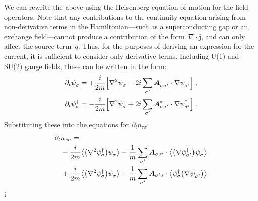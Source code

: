 We can rewrite the above using the Heisenberg equation of motion for the field operators.
Note that any contributions to the continuity equation arising from non-derivative terms in the Hamiltonian---such as a superconducting gap or an exchange field---cannot produce a contribution of the form~$\nabla\cdot\bm{j}$, and can only affect the source term~$q$.
Thus, for the purposes of deriving an expression for the current, it is sufficient to consider only derivative terms.
Including U(1) and SU(2) gauge fields, these can be written in the form:
\begin{align}
  \p t \pc{\psi_\sigma} &= +\frac{i}{2m} \Big[ \nabla^2\pc{\psi_\sigma} - 2i\sum_{\sigma'} \pc{\bm{A}_{\sigma\sigma'}} \cdot \nabla \pc{\psi_{\sigma'}} \Big]\,, \\
  \p t \hc{\psi_\sigma} &= -\frac{i}{2m} \Big[ \nabla^2\hc{\psi_\sigma} + 2i\sum_{\sigma'} \cc{\bm{A}_{\sigma\sigma'}} \cdot \nabla \hc{\psi_{\sigma'}} \Big]\,.
\end{align}
Substituting these into the equations for $\partial_t n_{\tau\sigma}$:
\begin{align}
  \p t & n_{e\sigma} = \\
       &- \frac{i}{2m} \avg[\big]{\big(\nabla^2\hc{\psi_\sigma}\big) \pc{\psi_\sigma}}
        + \frac{1}{m}  \sum_{\sigma'} \bm{A}_{\sigma\sigma'} \cdot \avg[\big]{\big(\nabla\hc{\psi_{\sigma'}}\big) \pc{\psi_{\sigma}}} \\
       &+ \frac{i}{2m} \avg[\big]{\big(\nabla^2\hc{\psi_\sigma}\big) \pc{\psi_\sigma}}
        + \frac{1}{m}  \sum_{\sigma'} \bm{A}_{\sigma'\sigma} \cdot \avg[\big]{\hc{\psi_\sigma} \big(\nabla\pc{\psi_{\sigma'}}\big)} \\
\end{align}
           i
